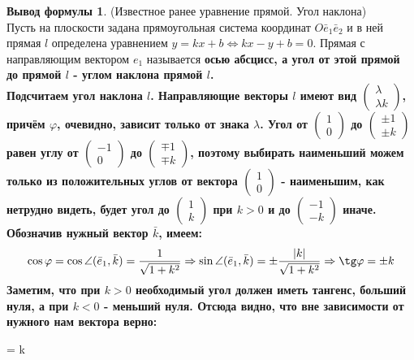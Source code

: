 \documentclass[a4paper, 12pt]{article}
\renewcommand{\phi}{\varphi}
\theoremstyle{definition}
\newtheorem*{formula}{Вывод формулы}
\newenvironment{boxedalign*}
  {\begin{equation*}\begin{lrbox}{\boxedalignbox}$\begin{aligned}}
  {\end{aligned}$\end{lrbox}\fbox{\usebox{\boxedalignbox}}\end{equation*}}
\begin{document}
	\begin{formula}(Известное ранее уравнение прямой. Угол наклона)\\
		Пусть на плоскости задана прямоугольная система координат $O\bar{e}_{1}\bar{e}_{2}$ и в ней прямая $l$ определена уравнением $y = kx + b \Leftrightarrow kx - y + b = 0$. Прямая с направляющим вектором $e_{1}$ называется \bfseries осью абсцисс\mdseries, а угол от этой прямой до прямой $l$ - \bfseries углом наклона \mdseries прямой $l$.\\
		Подсчитаем угол наклона $l$. Направляющие векторы $l$ имеют вид $\begin{pmatrix}\lambda\\ \lambda k\end{pmatrix}$, причём $\phi$, очевидно, зависит только от знака $\lambda$. Угол от $\begin{pmatrix} 1\\0 \end{pmatrix}$ до $\begin{pmatrix} \pm 1\\\pm k\end{pmatrix}$ равен углу от $\begin{pmatrix} -1\\0 \end{pmatrix}$ до $\begin{pmatrix} \mp 1\\\mp k\end{pmatrix}$, поэтому выбирать наименьший можем только из положительных углов от вектора $\begin{pmatrix} 1\\0 \end{pmatrix}$ - наименьшим, как нетрудно видеть, будет угол до $\begin{pmatrix} 1\\k \end{pmatrix}$ при $k>0$ и до $\begin{pmatrix} -1 \\ -k \end{pmatrix}$ иначе. Обозначив нужный вектор $\bar{k}$, имеем: 
		\begin{align*}
			\cos\phi = \cos\angle(\bar{e}_{1}, \bar{k}) = \frac{1}{\sqrt{1 + k^2}} \Rightarrow \sin\angle(\bar{e}_{1}, \bar{k}) = \pm\frac{|k|}{\sqrt{1 + k^2}} \Rightarrow \tg\phi = \pm k 
		\end{align*}
		Заметим, что при $k > 0$ необходимый угол должен иметь тангенс, больший нуля, а при $k < 0$ - меньший нуля. Отсюда видно, что вне зависимости от нужного нам вектора верно: \begin{boxedalign*} \tg\phi = k\end{boxedalign*}
	\end{formula}
\end{document}
